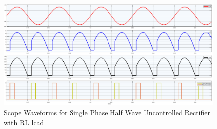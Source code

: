 \begin{figure}[h]
    \centering
    \includegraphics[width=1\textwidth]{images/experiment-2/circuit-scope-simulation-02.png}
    \caption{Scope Waveforms for Single Phase Half Wave Uncontrolled Rectifier with RL load}
    \label{Fig_waveform_single-phase-full-wave-controlled-rectifier-with-R-load}
\end{figure}

\pagebreak
